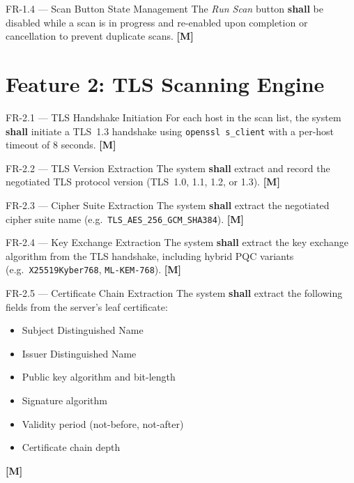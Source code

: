 \begin{reqbox}{FR-1.4 — Scan Button State Management}
  The \textit{Run Scan} button \textbf{shall} be disabled while a scan is in
  progress and re-enabled upon completion or cancellation to prevent duplicate
  scans. \hfill \textbf{[M]}
\end{reqbox}

\section{Feature 2: TLS Scanning Engine}
\label{sec:fr_tls}

\begin{reqbox}{FR-2.1 — TLS Handshake Initiation}
  For each host in the scan list, the system \textbf{shall} initiate a TLS~1.3
  handshake using \texttt{openssl s\_client} with a per-host timeout of 8 seconds.
  \hfill \textbf{[M]}
\end{reqbox}

\begin{reqbox}{FR-2.2 — TLS Version Extraction}
  The system \textbf{shall} extract and record the negotiated TLS protocol version
  (TLS~1.0, 1.1, 1.2, or 1.3). \hfill \textbf{[M]}
\end{reqbox}

\begin{reqbox}{FR-2.3 — Cipher Suite Extraction}
  The system \textbf{shall} extract the negotiated cipher suite name (e.g.\
  \texttt{TLS\_AES\_256\_GCM\_SHA384}). \hfill \textbf{[M]}
\end{reqbox}

\begin{reqbox}{FR-2.4 — Key Exchange Extraction}
  The system \textbf{shall} extract the key exchange algorithm from the TLS
  handshake, including hybrid PQC variants (e.g.\ \texttt{X25519Kyber768},
  \texttt{ML-KEM-768}). \hfill \textbf{[M]}
\end{reqbox}

\begin{reqbox}{FR-2.5 — Certificate Chain Extraction}
  The system \textbf{shall} extract the following fields from the server's leaf
  certificate:
  \begin{itemize}[noitemsep]
    \item Subject Distinguished Name
    \item Issuer Distinguished Name
    \item Public key algorithm and bit-length
    \item Signature algorithm
    \item Validity period (not-before, not-after)
    \item Certificate chain depth
  \end{itemize}
  \hfill \textbf{[M]}
\end{reqbox}

